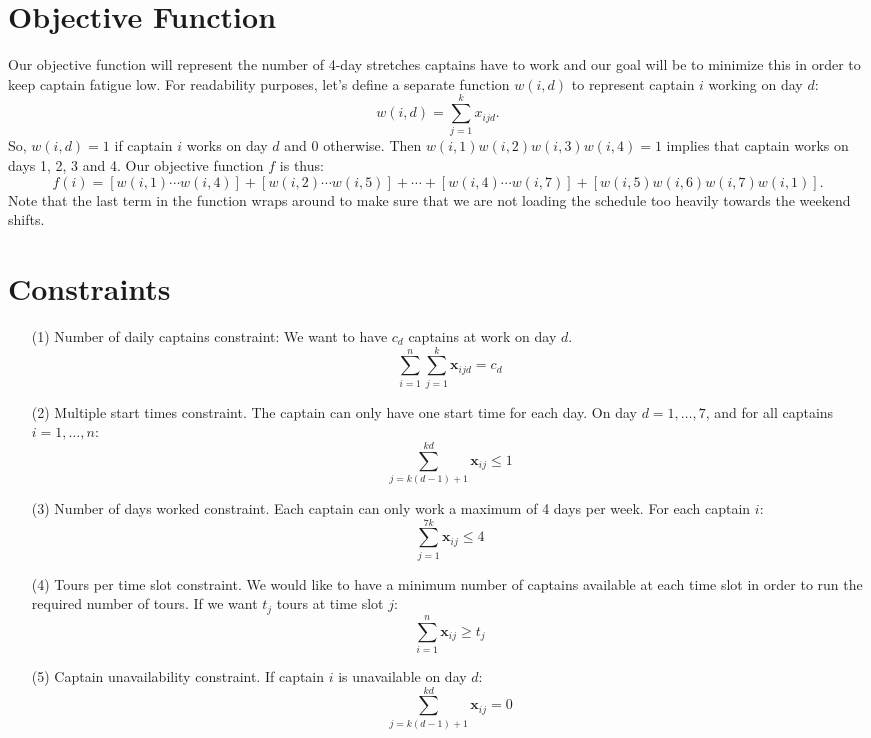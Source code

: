 \documentclass[12pt]{article}
\begin{document}
\section*{Objective Function}
Our objective function will represent the number of 4-day stretches captains have to work and our goal will be to minimize this in order to keep captain fatigue low. For readability purposes, let's define a separate function $w(i, d)$ to represent captain $i$ working on day $d$:
$$w(i,d) = \sum_{j = 1}^{k}{x_{ijd}}.$$
So, $w(i,d) = 1$ if captain $i$ works on day $d$ and 0 otherwise. Then $w(i, 1)w(i, 2)w(i, 3)w(i, 4) = 1$ implies that captain works on days 1, 2, 3 and 4. Our objective function $f$ is thus:
$$f(i) = [w(i, 1) \cdots w(i, 4)] + [w(i, 2) \cdots w(i, 5)] + \cdots + [w(i, 4) \cdots w(i, 7)] + [w(i, 5) w(i, 6) w(i, 7) w(i,1)].$$
Note that the last term in the function wraps around to make sure that we are not loading the schedule too heavily towards the weekend shifts.

\section*{Constraints}
\begin{enumerate}
\item[(1)] Number of daily captains constraint: We want to have $c_d$ captains at work on day $d$.
$$\sum_{i = 1}^{n}\sum_{j = 1}^{k}{\mathbf{x}_{ijd}} = c_d$$
\item[(2)] Multiple start times constraint. The captain can only have one start time for each day.
On day $d = 1,\dots, 7$, and for all captains $i = 1,\dots, n$:
$$\sum_{j = k(d-1) + 1}^{kd}{\mathbf{x}_{ij}} \le 1$$
\item[(3)] Number of days worked constraint. Each captain can only work a maximum of 4 days per week. 
For each captain $i$:
$$\sum_{j = 1}^{7k}{\mathbf{x}_{ij}} \le 4$$
\item[(4)] Tours per time slot constraint. We would like to have a minimum number of captains available at each time slot in order to run the required number of tours. If we want $t_j$ tours at time slot $j$:
$$\sum_{i = 1}^{n}{\mathbf{x}_{ij}} \ge t_j$$
\item[(5)] Captain unavailability constraint. If captain $i$ is unavailable on day $d$:
$$\sum_{j = k(d-1) + 1}^{kd}{\mathbf{x}_{ij}} = 0$$
\end{enumerate}
\end{document}
